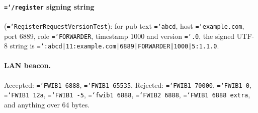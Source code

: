 \documentclass[11pt,a4paper]{article}
\newcommand{\code}[1]{\texttt{\hyphenchar\font=`\-\relax #1}}
\DeclareRobustCommand{\_}{\origunderscore\allowbreak}
\begin{document}
\paragraph{\code{/register} signing string} (\code{RegisterRequestVersionTest}): for pub text
\code{abcd}, host \code{example.com}, port 6889, role \code{FORWARDER}, timestamp 1000 and
version \code{1.1.0}, the signed UTF-8 string is
\code{4:abcd|11:example.com|6889|FORWARDER|1000|5:1.1.0}.

\paragraph{LAN beacon.} Accepted: \code{FWIB1 6888}, \code{FWIB1 65535}. Rejected:
\code{FWIB1 70000}, \code{FWIB1 0}, \code{FWIB1 12a}, \code{FWIB1 -5},
\code{fwib1 6888}, \code{FWIB2 6888}, \code{FWIB1 6888 extra}, and anything over 64 bytes.
\end{document}
